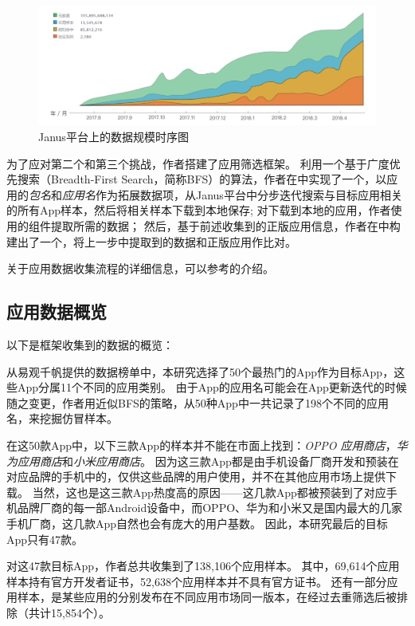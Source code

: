 \begin{figure}[htbp]
	\centering
	\includegraphics[width=\textwidth]{./Figures/edwin-Janus-data.png}
	\caption{Janus平台上的数据规模时序图}
	\label{fig:Janus-data}
	\vspace{-5mm}
\end{figure}

为了应对第二个和第三个挑战，作者搭建了应用筛选框架\mytool。
利用一个基于广度优先搜索（Breadth-First Search，简称BFS）的算法，作者在\mytool 中实现了一个\componentB ，以应用的\emph{包名}和\emph{应用名}作为拓展数据项，从Janus平台中分步迭代搜索与目标应用相关的所有App样本，然后将相关样本下载到本地保存;
对下载到本地的应用，作者使用\mytool 的组件\componentA 提取所需的数据；
然后，基于前述收集到的正版应用信息，作者在\mytool 中构建出了一个\componentC ，将上一步中提取到的数据和正版应用作比对。

关于应用数据收集流程的详细信息，可以参考的介绍。

\subsection{应用数据概览}
以下是框架收集到的数据的概览：

从易观千帆提供的数据榜单中，本研究选择了50个最热门的App作为目标App，这些App分属11个不同的应用类别。
由于App的应用名可能会在App更新迭代的时候随之变更，作者用近似BFS的策略，从50种App中一共记录了198个不同的应用名，来挖掘仿冒样本。

在这50款App中，以下三款App的样本并不能在市面上找到：\emph{OPPO 应用商店}，\emph{华为应用商店}和\emph{小米应用商店}。
因为这三款App都是由手机设备厂商开发和预装在对应品牌的手机中的，仅供这些品牌的用户使用，并不在其他应用市场上提供下载。
当然，这也是这三款App热度高的原因——这几款App都被预装到了对应手机品牌厂商的每一部Android设备中，而OPPO、华为和小米又是国内最大的几家手机厂商，这几款App自然也会有庞大的用户基数。
因此，本研究最后的目标App只有47款。

对这47款目标App，作者总共收集到了138,106个应用样本。
其中，69,614个应用样本持有官方开发者证书，52,638个应用样本并不具有官方证书。
还有一部分应用样本，是某些应用的分别发布在不同应用市场同一版本，在经过去重筛选后被排除（共计15,854个）。

